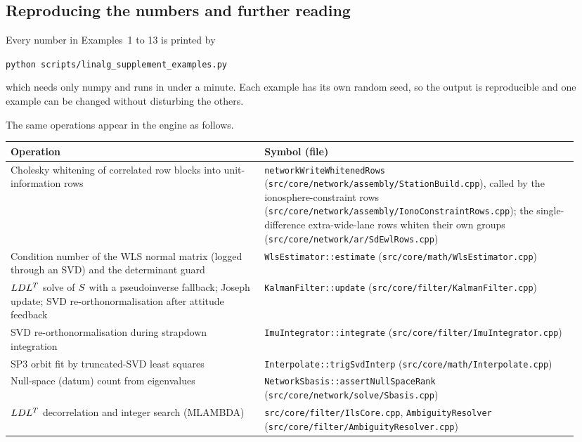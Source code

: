 \documentclass[main.tex]{subfiles}
\begin{document}
\subsection{Reproducing the numbers and further reading}\label{sec:la-reproduce}

Every number in Examples~1 to 13 is printed by
\begin{center}
\texttt{python scripts/linalg\_supplement\_examples.py}
\end{center}
which needs only numpy and runs in under a minute.  Each example has its
own random seed, so the output is reproducible and one example can be
changed without disturbing the others.

The same operations appear in the engine as follows.
\begin{center}
\small
\begin{tabular}{@{}>{\raggedright\arraybackslash}p{0.42\linewidth}>{\raggedright\arraybackslash}p{0.52\linewidth}@{}}
\toprule
Operation & Symbol (file) \\
\midrule
Cholesky whitening of correlated row blocks into unit-information rows
  & \texttt{networkWriteWhitenedRows}
    (\texttt{src/core/network/assembly/StationBuild.cpp}), called by the
    ionosphere-constraint rows
    (\texttt{src/core/network/assembly/IonoConstraintRows.cpp}); the
    single-difference extra-wide-lane rows whiten their own groups
    (\texttt{src/core/network/ar/SdEwlRows.cpp}) \\
Condition number of the WLS normal matrix (logged through an SVD) and the
  determinant guard & \texttt{WlsEstimator::estimate}
    (\texttt{src/core/math/WlsEstimator.cpp}) \\
$LDL^{T}$ solve of $S$ with a pseudoinverse fallback; Joseph
  update; SVD re-orthonormalisation after attitude feedback
  & \texttt{KalmanFilter::update} (\texttt{src/core/filter/KalmanFilter.cpp}) \\
SVD re-orthonormalisation during strapdown integration
  & \texttt{ImuIntegrator::integrate} (\texttt{src/core/filter/ImuIntegrator.cpp}) \\
SP3 orbit fit by truncated-SVD least squares
  & \texttt{Interpolate::trigSvdInterp} (\texttt{src/core/math/Interpolate.cpp}) \\
Null-space (datum) count from eigenvalues
  & \texttt{NetworkSbasis::assertNullSpaceRank} (\texttt{src/core/network/solve/Sbasis.cpp}) \\
$LDL^{T}$ decorrelation and integer search (MLAMBDA)
  & \texttt{src/core/filter/IlsCore.cpp},
    \texttt{AmbiguityResolver} (\texttt{src/core/filter/AmbiguityResolver.cpp}) \\
\bottomrule
\end{tabular}
\end{center}
\end{document}
